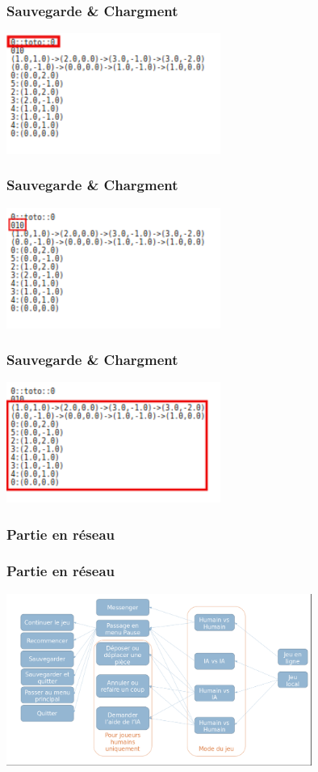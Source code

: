 \documentclass{beamer}
\begin{document}
    \begin{frame}
      \frametitle{Sauvegarde \& Chargment}
      \includegraphics[width=7cm]{./chargeGen.png}
    \end{frame}
    \begin{frame}
      \frametitle{Sauvegarde \& Chargment}
      \includegraphics[width=7cm]{./chargeIns.png}
    \end{frame}
    \begin{frame}
      \frametitle{Sauvegarde \& Chargment}
      \includegraphics[width=7cm]{./chargeCoup.png}
    \end{frame}
    \begin{frame}
        \frametitle{Partie en r\'eseau}
    \end{frame}
    \begin{frame}
        \frametitle{Partie en r\'eseau}
        \includegraphics[width=10cm]{deroulementPartie.png}
    \end{frame}
\end{document}
